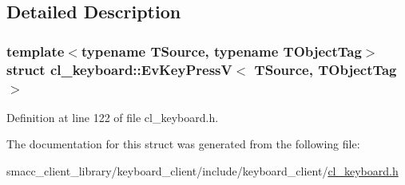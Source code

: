 \subsection{Detailed Description}
\subsubsection*{template$<$typename T\+Source, typename T\+Object\+Tag$>$\newline
struct cl\+\_\+keyboard\+::\+Ev\+Key\+Press\+V$<$ T\+Source, T\+Object\+Tag $>$}



Definition at line 122 of file cl\+\_\+keyboard.\+h.



The documentation for this struct was generated from the following file\+:\begin{DoxyCompactItemize}
\item 
smacc\+\_\+client\+\_\+library/keyboard\+\_\+client/include/keyboard\+\_\+client/\hyperlink{cl__keyboard_8h}{cl\+\_\+keyboard.\+h}\end{DoxyCompactItemize}
